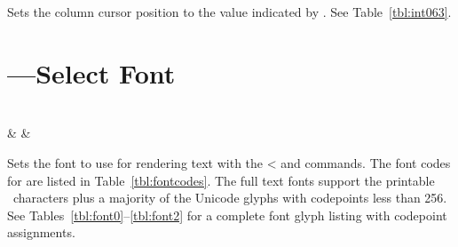 Sets the column cursor position to the value indicated by . See Table~\ref{tbl:int063}.

\section{---Select Font}
\begin{center}
\begin{bytefield}[endianness=little,bitwidth=0.11111\textwidth]{3}
	 \\
	 &
	 &
\end{bytefield}
\end{center}

Sets the font to use for rendering text with the \z< and  commands.
The font codes for  are listed in Table~\ref{tbl:fontcodes}.
The full text fonts support the printable \ascii\ characters plus a majority
of the Unicode glyphs with codepoints less than 256.  See Tables~\ref{tbl:font0}--\ref{tbl:font2}
for a complete font glyph listing with codepoint assignments.

